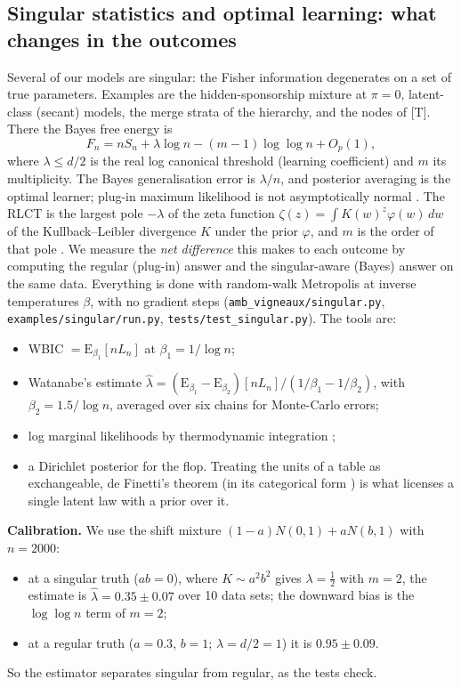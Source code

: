 \documentclass[11pt]{article}
\theoremstyle{definition}
\theoremstyle{remark}
\begin{document}
\subsection{Singular statistics and optimal learning: what changes in the outcomes}\label{sec:singular}
Several of our models are singular: the Fisher information degenerates on a set of true parameters. Examples are the hidden-sponsorship mixture at $\pi=0$, latent-class (secant) models, the merge strata of the hierarchy, and the nodes of [T]. There the Bayes free energy is
\[ F_n=nS_n+\lambda\log n-(m-1)\log\log n+O_p(1), \]
where $\lambda\le d/2$ is the real log canonical threshold (learning coefficient) and $m$ its multiplicity. The Bayes generalisation error is $\lambda/n$, and posterior averaging is the optimal learner; plug-in maximum likelihood is not asymptotically normal \cite{watanabe,watanabe18,wbic}. The RLCT is the largest pole $-\lambda$ of the zeta function $\zeta(z)=\int K(w)^z\varphi(w)\,dw$ of the Kullback--Leibler divergence $K$ under the prior $\varphi$, and $m$ is the order of that pole \cite{watanabe}. We measure the \emph{net difference} this makes to each outcome by computing the regular (plug-in) answer and the singular-aware (Bayes) answer on the same data. Everything is done with random-walk Metropolis at inverse temperatures $\beta$, with no gradient steps (\texttt{amb\_vigneaux/singular.py}, \texttt{examples/singular/run.py}, \texttt{tests/test\_singular.py}). The tools are:
\begin{itemize}
  \item WBIC $=\mathrm{E}_{\beta_1}[nL_n]$ at $\beta_1=1/\log n$;
  \item Watanabe's estimate $\hat\lambda=(\mathrm{E}_{\beta_1}-\mathrm{E}_{\beta_2})[nL_n]/(1/\beta_1-1/\beta_2)$, with $\beta_2=1.5/\log n$, averaged over six chains for Monte-Carlo errors;
  \item log marginal likelihoods by thermodynamic integration \cite{gelmanmeng};
  \item a Dirichlet posterior for the flop. Treating the units of a table as exchangeable, de Finetti's theorem (in its categorical form \cite{fgp21}) is what licenses a single latent law with a prior over it.
\end{itemize}

\textbf{Calibration.} We use the shift mixture $(1-a)N(0,1)+aN(b,1)$ with $n=2000$:
\begin{itemize}
  \item at a singular truth ($ab=0$), where $K\sim a^2b^2$ gives $\lambda=\tfrac12$ with $m=2$, the estimate is $\hat\lambda=0.35\pm0.07$ over 10 data sets; the downward bias is the $\log\log n$ term of $m=2$;
  \item at a regular truth ($a=0.3$, $b=1$; $\lambda=d/2=1$) it is $0.95\pm0.09$.
\end{itemize}
So the estimator separates singular from regular, as the tests check.
\end{document}
